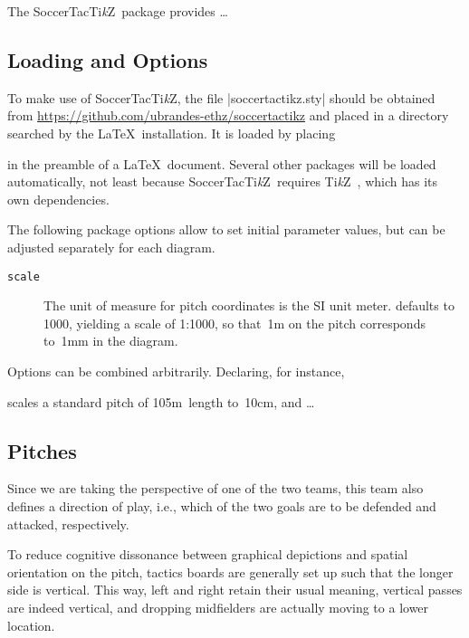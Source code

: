 \documentclass[a4paper,12pt]{ltxdoc}
\newcommand{\TikZ}{Ti\emph{k}Z}
\newcommand{\SoccerTacTikZ}{SoccerTac\TikZ}
\begin{document}
The \SoccerTacTikZ\ package provides \dots

\subsection{Loading and Options}\label{sec:options}

To make use of \textsf{\SoccerTacTikZ},
the file |soccertactikz.sty| should be
obtained from \url{https://github.com/ubrandes-ethz/soccertactikz}
and placed in a directory
searched by the \LaTeX\ installation.
It is loaded by placing
\begin{quote}
\end{quote}
in the preamble of a \LaTeX\ document. 
Several other packages will be loaded automatically,
not least because \SoccerTacTikZ\ requires \TikZ~\cite{tikz},
which has its own dependencies.

The following package options allow to set initial parameter values,
but can be adjusted separately for each diagram.
\begin{description}
\item[\tt scale] The unit of measure for pitch coordinates is the SI unit meter.  defaults to 1000, yielding a scale of 1:1000, so that~1m on the pitch corresponds to~1mm in the diagram. 
\end{description}
Options can be combined arbitrarily. Declaring, for instance,
\begin{quote}
\end{quote}
scales a standard pitch of 105m~length to~10cm,
and \dots



\subsection{Pitches}\label{sec:pitch}

Since we are taking the perspective of one of the two teams,
this team also defines a direction of play,
i.e., which of the two goals are
to be defended and attacked, respectively.

To reduce cognitive dissonance
between graphical depictions and spatial orientation on the pitch,
tactics boards are generally set up
such that the longer side is vertical.
This way, left and right retain their usual meaning,
vertical passes are indeed vertical,
and dropping midfielders are actually moving to a lower location.
\end{document}
